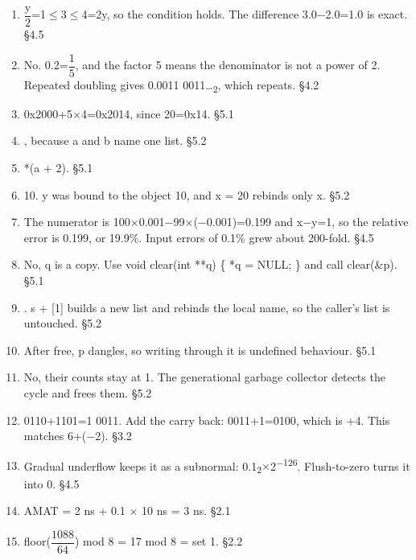 \documentclass[11pt]{article}
\begin{document}
\begin{keepsection}
\begin{enumerate}
\item {\small\ensuremath{\dfrac{\mathrm{y}}{2}}}=1\ensuremath{\leq}3\ensuremath{\leq}4=2y, so the condition holds. The difference 3.0\ensuremath{-}2.0=1.0 is exact. \hfill{\small\color{FAUblue}§4.5}
\item No. 0.2={\small\ensuremath{\dfrac{1}{5}}}, and the factor 5 means the denominator is not a power of 2. Repeated doubling gives 0.0011 0011…\textsubscript{2}, which repeats. \hfill{\small\color{FAUblue}§4.2}
\item 0x2000+5\ensuremath{\times}4=0x2014, since 20=0x14. \hfill{\small\color{FAUblue}§5.1}
\item [1, 2, 3], because a and b name one list. \hfill{\small\color{FAUblue}§5.2}
\item *(a + 2). \hfill{\small\color{FAUblue}§5.1}
\item 10. y was bound to the object 10, and x = 20 rebinds only x. \hfill{\small\color{FAUblue}§5.2}
\item The numerator is 100\ensuremath{\times}0.001\ensuremath{-}99\ensuremath{\times}(\ensuremath{-}0.001)=0.199 and x\ensuremath{-}y=1, so the relative error is 0.199, or 19.9\%. Input errors of 0.1\% grew about 200-fold. \hfill{\small\color{FAUblue}§4.5}
\item No, q is a copy. Use void clear(int **q) \{ *q = NULL; \} and call clear(\&p). \hfill{\small\color{FAUblue}§5.1}
\item [0]. s + [1] builds a new list and rebinds the local name, so the caller’s list is untouched. \hfill{\small\color{FAUblue}§5.2}
\item After free, p dangles, so writing through it is undefined behaviour. \hfill{\small\color{FAUblue}§5.1}
\item No, their counts stay at 1. The generational garbage collector detects the cycle and frees them. \hfill{\small\color{FAUblue}§5.2}
\item 0110+1101=1 0011. Add the carry back: 0011+1=0100, which is +4. This matches 6+(\ensuremath{-}2). \hfill{\small\color{FAUblue}§3.2}
\item Gradual underflow keeps it as a subnormal: 0.1\textsubscript{2}\ensuremath{\times}2\textsuperscript{\ensuremath{-}126}. Flush-to-zero turns it into 0. \hfill{\small\color{FAUblue}§4.5}
\item AMAT = 2 ns + 0.1 \ensuremath{\times} 10 ns = 3 ns. \hfill{\small\color{FAUblue}§2.1}
\item floor({\small\ensuremath{\dfrac{1088}{64}}}) mod 8 = 17 mod 8 = set 1. \hfill{\small\color{FAUblue}§2.2}

\end{enumerate}
\end{keepsection}
\end{document}
